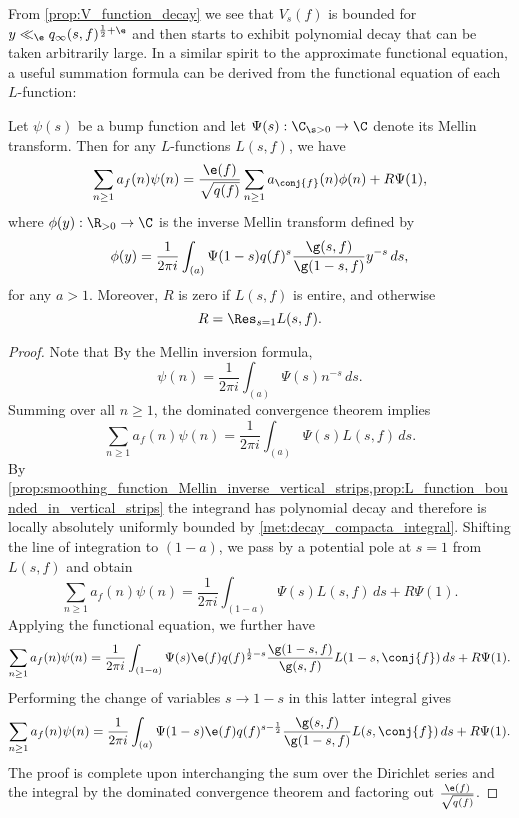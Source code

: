     From \cref{prop:V_function_decay} we see that $V_{s}(f)$ is bounded for $y \ll_{\e} q_{\infty}(s,f)^{\frac{1}{2}+\e}$ and then starts to exhibit polynomial decay that can be taken arbitrarily large. In a similar spirit to the approximate functional equation, a useful summation formula can be derived from the functional equation of each $L$-function:

    \begin{theorem}
      Let $\psi(s)$ be a bump function and let $\Psi(s):\C_{\s > 0} \to \C$ denote its Mellin transform. Then for any $L$-functions $L(s,f)$, we have
      \[
        \sum_{n \ge 1}a_{f}(n)\psi(n) = \frac{\e(f)}{\sqrt{q(f)}}\sum_{n \ge 1}a_{\conj{f}}(n)\phi(n)+R\Psi(1),
      \]
      where $\phi(y):\R_{> 0} \to \C$ is the inverse Mellin transform defined by
      \[
        \phi(y) = \frac{1}{2\pi i}\int_{(a)}\Psi(1-s)q(f)^{s}\frac{\g(s,f)}{\g(1-s,f)}y^{-s}\,ds,
      \]
      for any $a > 1$. Moreover, $R$ is zero if $L(s,f)$ is entire, and otherwise
      \[
        R = \Res_{s = 1}L(s,f).
      \]
    \end{theorem}
    \begin{proof}
      Note that 
      By the Mellin inversion formula,
      \[
        \psi(n) = \frac{1}{2\pi i}\int_{(a)}\Psi(s)n^{-s}\,ds.
      \]
      Summing over all $n \ge 1$, the dominated convergence theorem implies
      \[
        \sum_{n \ge 1}a_{f}(n)\psi(n) = \frac{1}{2\pi i}\int_{(a)}\Psi(s)L(s,f)\,ds.
      \]
      By \cref{prop:smoothing_function_Mellin_inverse_vertical_strips,prop:L_function_bounded_in_vertical_strips} the integrand has polynomial decay and therefore is locally absolutely uniformly bounded by \cref{met:decay_compacta_integral}. Shifting the line of integration to $(1-a)$, we pass by a potential pole at $s = 1$ from $L(s,f)$ and obtain
      \[
        \sum_{n \ge 1}a_{f}(n)\psi(n) = \frac{1}{2\pi i}\int_{(1-a)}\Psi(s)L(s,f)\,ds+R\Psi(1).
      \]
      Applying the functional equation, we further have
      \[
        \sum_{n \ge 1}a_{f}(n)\psi(n) = \frac{1}{2\pi i}\int_{(1-a)}\Psi(s)\e(f)q(f)^{\frac{1}{2}-s}\frac{\g(1-s,f)}{\g(s,f)}L(1-s,\conj{f})\,ds+R\Psi(1).
      \]
      Performing the change of variables $s \to 1-s$ in this latter integral gives
      \[
        \sum_{n \ge 1}a_{f}(n)\psi(n) = \frac{1}{2\pi i}\int_{(a)}\Psi(1-s)\e(f)q(f)^{s-\frac{1}{2}}\frac{\g(s,f)}{\g(1-s,f)}L(s,\conj{f})\,ds+R\Psi(1).
      \]
      The proof is complete upon interchanging the sum over the Dirichlet series and the integral by the dominated convergence theorem and factoring out $\frac{\e(f)}{\sqrt{q(f)}}$.
    \end{proof}
